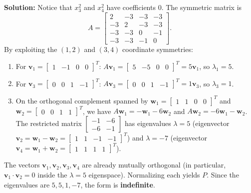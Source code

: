 \documentclass[11pt, letterpaper]{article}
\theoremstyle{definition}
\theoremstyle{remark}
\begin{document}
\textbf{Solution:}
Notice that $x_3^2$ and $x_4^2$ have coefficients $0$. The symmetric matrix is
\[
A = \begin{bmatrix} 2 & -3 & -3 & -3 \\ -3 & 2 & -3 & -3 \\ -3 & -3 & 0 & -1 \\ -3 & -3 & -1 & 0 \end{bmatrix}.
\]
By exploiting the $(1,2)$ and $(3,4)$ coordinate symmetries:
\begin{enumerate}
    \item For $\mathbf{v}_1 = \begin{bmatrix} 1 & -1 & 0 & 0 \end{bmatrix}^T$: $A\mathbf{v}_1 = \begin{bmatrix} 5 & -5 & 0 & 0 \end{bmatrix}^T = 5\mathbf{v}_1$, so $\lambda_1 = 5$.
    \item For $\mathbf{v}_3 = \begin{bmatrix} 0 & 0 & 1 & -1 \end{bmatrix}^T$: $A\mathbf{v}_3 = \begin{bmatrix} 0 & 0 & 1 & -1 \end{bmatrix}^T = 1\mathbf{v}_3$, so $\lambda_3 = 1$.
    \item On the orthogonal complement spanned by $\mathbf{w}_1 = \begin{bmatrix} 1 & 1 & 0 & 0 \end{bmatrix}^T$ and $\mathbf{w}_2 = \begin{bmatrix} 0 & 0 & 1 & 1 \end{bmatrix}^T$, we have $A\mathbf{w}_1 = -\mathbf{w}_1 - 6\mathbf{w}_2$ and $A\mathbf{w}_2 = -6\mathbf{w}_1 - \mathbf{w}_2$. The restricted matrix $\begin{bmatrix} -1 & -6 \\ -6 & -1 \end{bmatrix}$ has eigenvalues $\lambda = 5$ (eigenvector $\mathbf{v}_2 = \mathbf{w}_1 - \mathbf{w}_2 = \begin{bmatrix} 1 & 1 & -1 & -1 \end{bmatrix}^T$) and $\lambda = -7$ (eigenvector $\mathbf{v}_4 = \mathbf{w}_1 + \mathbf{w}_2 = \begin{bmatrix} 1 & 1 & 1 & 1 \end{bmatrix}^T$).
\end{enumerate}
The vectors $\mathbf{v}_1, \mathbf{v}_2, \mathbf{v}_3, \mathbf{v}_4$ are already mutually orthogonal (in particular, $\mathbf{v}_1 \cdot \mathbf{v}_2 = 0$ inside the $\lambda = 5$ eigenspace). Normalizing each yields $P$. Since the eigenvalues are $5, 5, 1, -7$, the form is \textbf{indefinite}.
\end{document}
